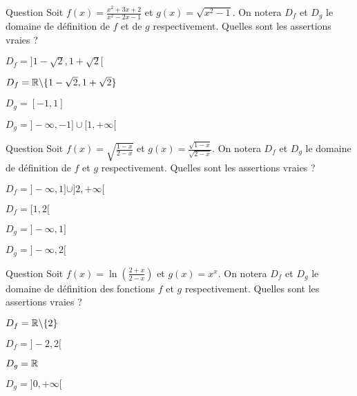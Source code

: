 

\begin{multi}[multiple,feedback=
{\(f\) est définie si et seulement si \(x^2-2x-1 \neq 0\), c'est-à-dire \(x\neq 1-\sqrt 2\) et \(x\neq 1+\sqrt 2\). 
\(g\) est définie si et seulement si \(x^2-1 \ge 0\), c'est-à-dire \(x\ge 1\) ou \(x\le -1\).
}]{Question}
Soit \(f(x)= \frac{x^2+3x+2}{x^2-2x-1}\) et \( g(x)= \sqrt{x^2-1}\). On notera \(D_f\) et \(D_g\) le domaine de définition de \(f\) et  de \(g\) respectivement. Quelles sont les assertions vraies ?

    \item \(D_f=]1-\sqrt 2, 1+\sqrt 2[\)
    \item* \(D_f=\mathbb{R} \backslash \{ 1-\sqrt 2, 1+\sqrt 2\}\)
    \item \(D_g=[-1,1]\)
    \item* \(D_g=]-\infty, -1]\cup [1, +\infty[\)
\end{multi}


\begin{multi}[multiple,feedback=
{\(f\) est définie  si \(x\neq 2\) et \(\frac{1-x}{2-x}\ge 0\). On déduit que 
\(D_f=]-\infty, 1] \cup ]2,+\infty[\). \(g\) est définie  si \(1-x \ge 0\) et \(2-x > 0\),  c'est-à-dire \(x\le 1\). 
}]{Question}
Soit \( f(x)= \sqrt{\frac{1-x}{2-x}} \) et \(g(x)=\frac{\sqrt{1-x}}{\sqrt{2-x}}\). On notera \(D_f\) et \(D_g\) le domaine de définition de \(f\) et \(g\) respectivement. Quelles sont les assertions vraies ?

    \item* \(D_f=]-\infty, 1] \cup ]2,+\infty[\)
    \item \(D_f= [1,2[\)
    \item* \(D_g=]-\infty, 1]\)
    \item \(D_g=]-\infty, 2[\)
\end{multi}


\begin{multi}{Question}
Soit \( f(x)= \ln(\frac{2+x}{2-x}) \) et \(g(x)=x^x\). On notera \(D_f\) et \(D_g\) le domaine de définition des fonctions \(f\) et \(g\) respectivement. Quelles sont les assertions vraies ?

    \item \(D_f=\mathbb{R}\backslash\{2\}\)
    \item* \(D_f=]-2,2[\)
    \item \(D_g=\mathbb{R}\)
    \item* \(D_g=]0,+\infty[\)
\end{multi}



